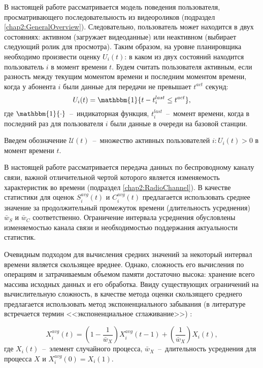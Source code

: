 В настоящей работе рассматривается модель поведения пользователя, просматривающего последовательность из видеороликов (подраздел \ref{chap2:GeneralOverview}). Следовательно, пользователь может находится в двух состояниях: активном (загружает видеоданные) или неактивном (выбирает следующий ролик для просмотра). Таким образом, на уровне планировщика необходимо произвести оценку $U_i(t)$: в каком из двух состояний находится пользователь $i$ в момент времени $t$.
Будем считать пользователя активным, если разность между текущим моментом времени и последним моментом времени, когда у абонента $i$ были данные для передачи не превышает $t^{act}$ секунд:
\begin{equation}
	\label{eq:activityEstimation}
	U_i(t) = \mathbbm{1}\{t - t_i^{last} \leq t^{act}\},
\end{equation}
где $\mathbbm{1}\{\cdot\}$~--~индикаторная функция, $t_i^{last}$~--~момент времени, когда в последний раз для пользователя $i$ были данные в очереди на базовой станции.

Введем обозначение $\mathcal{U}(t)$~--~множество активных пользователей $i:U_i(t) > 0$ в момент времени $t$.

В настоящей работе рассматривается передача данных по беспроводному каналу связи, важной отличительной чертой которого является изменяемость характеристик во времени (подраздел \ref{chap2:RadioChannel}). В качестве статистики для оценок $S_i^{avg}(t)$ и $C_i^{avg}(t)$ предлагается использовать среднее значение за продолжительный промежуток времени (длительность усреднения) $\bar{w}_{S}$ и $\bar{w}_{C}$ соответственно. Ограничение интервала усреднения обусловлены изменяемостью канала связи и необходимостью поддержания актуальности статистик.

Очевидным подходом для вычисления средних значений за некоторый интервал времени является скользящее вреднее. Однако, сложность его вычисления по операциям и затрачиваемым объемом памяти достаточно высока: хранение всего массива исходных данных и его обработка. Ввиду существующих ограничений на вычислительную сложность, в качестве метода оценки скользящего среднего предлагается использовать метод экспоненциального забывания (в литературе встречается термин <<экспоненциальное сглаживание>>) \cite{exp_slide}:

$$X_i^{avg}(t) = \left(1 - \frac{1}{\bar{w}_{X}}\right)X_i^{avg}(t - 1) + \left(\frac{1}{\bar{w}_{X}}\right)X_i(t),$$
где $X_i(t)$~--~элемент случайного процесса, $\bar{w}_{X}$~--~длительность усреднения для процесса $X$ и $X_i^{avg}(0) = X_i(1)$.

